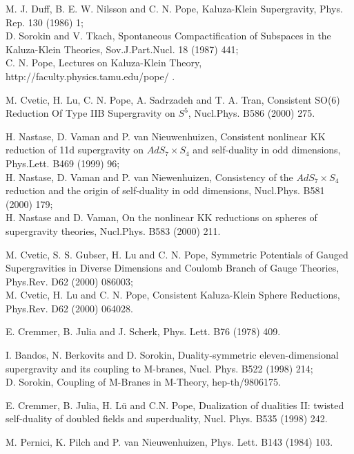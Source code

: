 \documentclass[a4paper,11pt]{article}
\begin{document}
\begin{thebibliography}{99}
M. J. Duff, B. E. W. Nilsson and C. N. Pope, Kaluza-Klein
Supergravity, Phys. Rep. 130 (1986) 1;\\
D. Sorokin and V. Tkach, Spontaneous Compactification of Subspaces
in the Kaluza-Klein Theories, Sov.J.Part.Nucl. 18 (1987) 441;\\
C. N. Pope, Lectures on Kaluza-Klein Theory,
http://faculty.physics.tamu.edu/pope/ .



M. Cvetic, H. Lu, C. N. Pope, A. Sadrzadeh and T. A. Tran,
Consistent SO(6) Reduction Of Type IIB Supergravity on $S^5$,
Nucl.Phys. B586 (2000) 275.









H. Nastase, D. Vaman and P. van Nieuwenhuizen, Consistent
nonlinear KK reduction of 11d supergravity on $AdS_7\times S_4$
and self-duality in odd dimensions, Phys.Lett. B469 (1999) 96;\\
H. Nastase, D. Vaman and P. van Niewenhuizen, Consistency of the
$AdS_7\times S_4$ reduction and the origin of self-duality in odd
dimensions, Nucl.Phys. B581 (2000) 179; \\H. Nastase and D. Vaman,
On the nonlinear KK reductions on spheres of supergravity
theories, Nucl.Phys. B583 (2000) 211.

M. Cvetic, S. S. Gubser, H. Lu and C. N. Pope,
Symmetric Potentials of Gauged Supergravities in Diverse Dimensions and
Coulomb Branch of Gauge Theories, Phys.Rev. D62 (2000) 086003;\\
M. Cvetic, H. Lu and C. N. Pope, Consistent Kaluza-Klein Sphere
Reductions, Phys.Rev. D62 (2000) 064028.



E. Cremmer, B. Julia and J. Scherk, Phys. Lett. B76 (1978) 409.


I. Bandos, N. Berkovits and D. Sorokin, Duality-symmetric
eleven-dimensional supergravity and its coupling to M-branes,
Nucl. Phys.  B522 (1998) 214;\\
D. Sorokin, Coupling of M-Branes in M-Theory, hep-th/9806175.

E. Cremmer, B. Julia, H. L\"u and C.N. Pope, Dualization of dualities II:
twisted self-duality of doubled fields and superduality, Nucl. Phys. B535
(1998) 242.


M. Pernici, K. Pilch and P. van Nieuwenhuizen, Phys. Lett. B143 (1984) 103.



\end{thebibliography}
\end{document}
